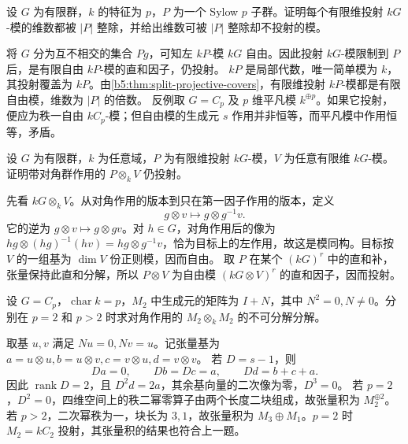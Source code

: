 \begin{optionalexercise}\label{b5:ex:08-projective-sylow-dimension}
	设 \(G\) 为有限群，\(k\) 的特征为 \(p\)，\(P\) 为一个 Sylow \(p\) 子群。证明每个有限维投射 \(kG\)-模的维数都被 \(|P|\) 整除，并给出维数可被 \(|P|\) 整除却不投射的模。
\end{optionalexercise}
\begin{solution}
	将 \(G\) 分为互不相交的集合 \(Pg\)，可知左 \(kP\)-模 \(kG\) 自由。因此投射 \(kG\)-模限制到 \(P\) 后，是有限自由 \(kP\)-模的直和因子，仍投射。 \(kP\) 是局部代数，唯一简单模为 \(k\)，其投射覆盖为 \(kP\)。由\cref{b5:thm:split-projective-covers}，有限维投射 \(kP\)-模都是有限自由模，维数为 \(|P|\) 的倍数。 反例取 \(G=C_p\) 及 \(p\) 维平凡模 \(k^{\oplus p}\)。如果它投射，便应为秩一自由 \(kC_p\)-模；但自由模的生成元 \(s\) 作用并非恒等，而平凡模中作用恒等，矛盾。
\end{solution}

\begin{optionalexercise}\label{b5:ex:08-projective-tensor}
	设 \(G\) 为有限群，\(k\) 为任意域，\(P\) 为有限维投射 \(kG\)-模，\(V\) 为任意有限维 \(kG\)-模。证明带对角群作用的 \(P\otimes_k V\) 仍投射。
\end{optionalexercise}
\begin{solution}
	先看 \(kG\otimes_kV\)。从对角作用的版本到只在第一因子作用的版本，定义
	\[
		g\otimes v\longmapsto g\otimes g^{-1}v.
	\]
	它的逆为 \(g\otimes v\mapsto g\otimes gv\)。对 \(h\in G\)，对角作用后的像为 \(hg\otimes(hg)^{-1}(hv)=hg\otimes g^{-1}v\)，恰为目标上的左作用，故这是模同构。目标按 \(V\) 的一组基为 \(\dim V\) 份正则模，因而自由。 取 \(P\) 在某个 \((kG)^r\) 中的直和补，张量保持此直和分解，所以 \(P\otimes V\) 为自由模 \((kG\otimes V)^r\) 的直和因子，因而投射。
\end{solution}

\begin{optionalexercise}\label{b5:ex:08-two-block-tensor}
	设 \(G=C_p\)，\(\operatorname{char}k=p\)，\(M_2\) 中生成元的矩阵为 \(I+N\)，其中 \(N^2=0,N\neq0\)。分别在 \(p=2\) 和 \(p>2\) 时求对角作用的 \(M_2\otimes_kM_2\) 的不可分解分解。
\end{optionalexercise}
\begin{solution}
	取基 \(u,v\) 满足 \(Nu=0,Nv=u\)。记张量基为 \(a=u\otimes u,b=u\otimes v,c=v\otimes u,d=v\otimes v\)。 若 \(D=s-1\)，则
	\[
		Da=0,\qquad Db=Dc=a,\qquad Dd=b+c+a.
	\]
	因此 \(\operatorname{rank}D=2\)，且 \(D^2d=2a\)，其余基向量的二次像为零，\(D^3=0\)。 若 \(p=2\)，\(D^2=0\)，四维空间上的秩二幂零算子由两个长度二块组成，故张量积为 \(M_2^{\oplus2}\)。 若 \(p>2\)，二次幂秩为一，块长为 \(3,1\)，故张量积为 \(M_3\oplus M_1\)。\(p=2\) 时 \(M_2=kC_2\) 投射，其张量积的结果也符合上一题。
\end{solution}

